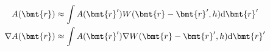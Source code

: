 \begin{frame}
\begin{columns}[T]
\begin{column}{.6\textwidth}
            \begin{figure}[h]
                \centering
                \def\svgwidth{0.5\textwidth}
                
                \label{fig: function and fields}
            \end{figure}

            \begin{align}
                A(\bmt{r})        & \approx \int A(\bmt{r}') W(\bmt{r}-\bmt{r}', h)
                \mathrm{d}\bmt{r}'                                                      \\
                \nabla A(\bmt{r}) & \approx \int A(\bmt{r}') \nabla W(\bmt{r}-\bmt{r}',
                h) \mathrm{d}\bmt{r}'
            \end{align}
        \end{column}
    \end{columns}
\end{frame}

